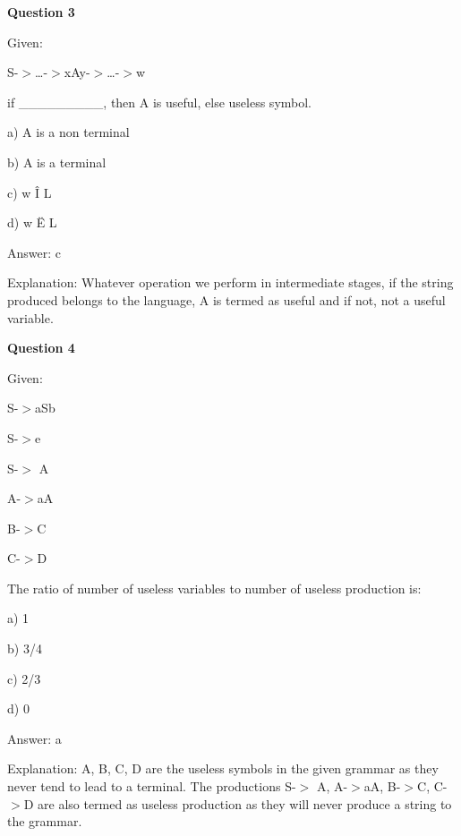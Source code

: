 \documentclass{article}
\begin{document}
\begin{mdframed}[linewidth=1pt, roundcorner=5pt, linecolor=gray!30, backgroundcolor=gray!5]
\textbf{Question 3} 

Given:

S-$>$…-$>$xAy-$>$…-$>$w

if \_\_\_\_\_\_\_\_\_, then A is useful, else useless symbol.

a) A is a non terminal

b) A is a terminal

c) w Î L

d) w Ë L
\vspace{5pt} \par
\begin{tcolorbox}[colback=green!5, colframe=green!40!black, title=Solution]
Answer: c

Explanation: Whatever operation we perform in intermediate stages, if the string produced belongs to the language, A is termed as useful and if not, not a useful variable.
\end{tcolorbox}
\end{mdframed}
\newpage

\begin{mdframed}[linewidth=1pt, roundcorner=5pt, linecolor=gray!30, backgroundcolor=gray!5]
\textbf{Question 4} 

Given:

S-$>$aSb

S-$>$e

S-$>$ A

A-$>$aA

B-$>$C

C-$>$D

The ratio of number of useless variables to number of useless production is:

a) 1

b) 3/4

c) 2/3

d) 0
\vspace{5pt} \par
\begin{tcolorbox}[colback=green!5, colframe=green!40!black, title=Solution]
Answer: a

Explanation: A, B, C, D are the useless symbols in the given grammar as they never tend to lead to a terminal. The productions S-$>$ A, A-$>$aA, B-$>$C, C-$>$D are also termed as useless production as they will never produce a string to the grammar.
\end{tcolorbox}
\end{mdframed}
\end{document}
